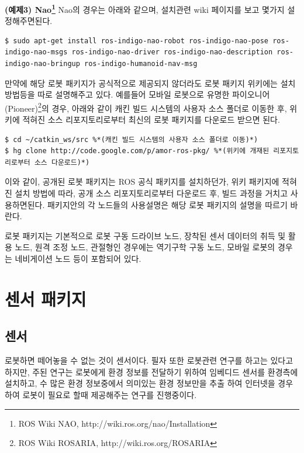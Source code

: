 \textbf{(예제3) Nao\footnote{ROS Wiki NAO, http://wiki.ros.org/nao/Installation}}
Nao의 경우는 아래와 같으며, 설치관련 wiki 페이지를 보고 몇가지 설정해주면된다.
\begin{lstlisting}[language=ROS]
$ sudo apt-get install ros-indigo-nao-robot ros-indigo-nao-pose ros-indigo-nao-msgs ros-indigo-nao-driver ros-indigo-nao-description ros-indigo-nao-bringup ros-indigo-humanoid-nav-msg
\end{lstlisting}

만약에 해당 로봇 패키지가 공식적으로 제공되지 않더라도 로봇 패키지 위키에는 설치 방법등을 따로 설명해주고 있다. 예를들어 모바일 로봇으로 유명한 파이오니어(Pioneer)\footnote{ROS Wiki ROSARIA, http://wiki.ros.org/ROSARIA}의 경우, 아래와 같이 캐킨 빌드 시스템의 사용자 소스 폴더로 이동한 후, 위키에 적혀진 소스 리포지토리로부터 최신의 로봇 패키지를 다운로드 받으면 된다. 

\vspace{\baselineskip}
\begin{lstlisting}[language=ROS]
$ cd ~/catkin_ws/src %*(캐킨 빌드 시스템의 사용자 소스 폴더로 이동)*)
$ hg clone http://code.google.com/p/amor-ros-pkg/ %*(위키에 개재된 리포지토리로부터 소스 다운로드)*)
\end{lstlisting}

이와 같이, 공개된 로봇 패키지는 ROS 공식 패키지를 설치하던가, 위키 패키지에 적혀진 설치 방법에 따라, 공개 소스 리포지토리로부터 다운로드 후, 빌드 과정을 거치고 사용하면된다. 패키지안의 각 노드들의 사용설명은 해당 로봇 패키지의 설명을 따르기 바란다.

로봇 패키지는 기본적으로 로봇 구동 드라이브 노드, 장착된 센서 데이터의 취득 및 활용 노드, 원격 조정 노드, 관절형인 경우에는 역기구학 구동 노드, 모바일 로봇의 경우는 네비게이션 노드 등이 포함되어 있다. 


\newpage
\section{센서 패키지}

\subsection{센서}

로봇하면 떼어놓을 수 없는 것이 센서이다. 필자 또한 로봇관련 연구를 하고는 있다고 하지만, 주된 연구는 로봇에게 환경 정보를 전달하기 위하여 임베디드 센서를 환경측에 설치하고, 수 많은 환경 정보중에서 의미있는 환경 정보만을 추출 하여 인터넷을 경우하여 로봇이 필요로 할때 제공해주는 연구를 진행중이다. 

